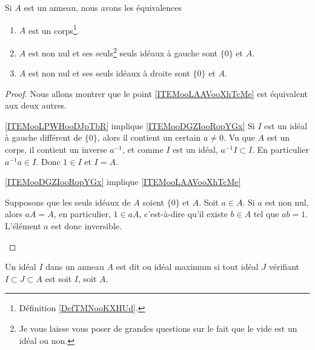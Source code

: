 \begin{proposition}     \label{AnnCorpsIdeal}\label{PROPooUOCVooZGAVVk}
    Si \( A\) est un anneau, nous avons les équivalences
    \begin{enumerate}
        \item       \label{ITEMooLAAVooXhTcMe}
            \( A\) est un corps\footnote{Définition \ref{DefTMNooKXHUd}.}.
        \item       \label{ITEMooDGZIooRopYGx}
            \( A\) est non nul et ses seuls\footnote{Je vous laisse vous poser de grandes questions sur le fait que le vide est un idéal ou non.} seuls idéaux à gauche sont \( \{ 0 \}\) et \( A\).
        \item       \label{ITEMooLPWHooDJpTbR}
            \( A\) est non nul et ses seuls idéaux à droite sont \( \{ 0 \}\) et \( A\).
    \end{enumerate}
\end{proposition}

\begin{proof}
    Nous allons montrer que le point \ref{ITEMooLAAVooXhTcMe} est équivalent aux deux autres.
    \begin{subproof}
        \item[\ref{ITEMooLPWHooDJpTbR} implique \ref{ITEMooDGZIooRopYGx}]
            Si \( I\) est un idéal à gauche différent de \( \{ 0 \}\), alors il contient un certain \( a\neq 0\). Vu que \( A\) est un corps, il contient un inverse \( a^{-1}\), et comme \( I\) est un idéal, \( a^{-1} I\subset I\). En particulier \( a^{-1}a\in I\). Donc \( 1\in I\) et \( I=A\).
        \item[\ref{ITEMooDGZIooRopYGx} implique \ref{ITEMooLAAVooXhTcMe}]

            Supposons que les seuls idéaux de \( A\) soient \( \{ 0 \}\) et \( A\). Soit \( a\in A\). Si \( a\) est non nul, alors \( aA=A\), en particulier, \( 1\in aA\), c'est-à-dire qu'il existe \( b\in A\) tel que \( ab=1\). L'élément \( a\) est donc inversible.
    \end{subproof}
\end{proof}

\begin{definition}\label{DEFIdealMax}
Un idéal \( I\) dans un anneau \( A \) est dit  ou idéal maximum si tout idéal \( J \) vérifiant \( I \subset J \subset A \) est soit \( I \), soit \( A \).
\end{definition}

